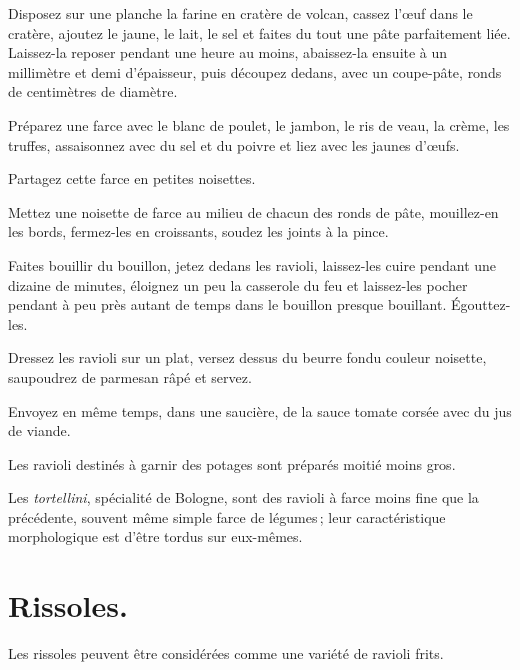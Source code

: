 Disposez sur une planche la farine en cratère de volcan, cassez l'œuf dans le
cratère, ajoutez le jaune, le lait, le sel et faites du tout une pâte
parfaitement liée. Laissez-la reposer pendant une heure au moins, abaissez-la
ensuite à un millimètre et demi d'épaisseur, puis découpez dedans, avec un
coupe-pâte, {\mmm} ronds de {\mmm} centimètres de diamètre.

Préparez une farce avec le blanc de poulet, le jambon, le ris de veau, la
crème, les truffes, assaisonnez avec du sel et du poivre et liez avec les
jaunes d'œufs.

Partagez cette farce en {\mmm} petites noisettes.

Mettez une noisette de farce au milieu de chacun des ronds de pâte, mouillez-en
les bords, fermez-les en croissants, soudez les joints à la pince.

Faites bouillir du bouillon, jetez dedans les ravioli, laissez-les cuire
pendant une dizaine de minutes, éloignez un peu la casserole du feu et
laissez-les pocher pendant à peu près autant de temps dans le bouillon presque
bouillant. Égouttez-les.

Dressez les ravioli sur un plat, versez dessus du beurre fondu couleur
noisette, saupoudrez de parmesan râpé et servez.

Envoyez en même temps, dans une saucière, de la sauce tomate corsée avec du jus
de viande.

\sk

Les ravioli destinés à garnir des potages sont préparés moitié moins gros.

\sk

Les \textit{tortellini}, spécialité de Bologne, sont des ravioli à farce moins
fine que la précédente, souvent même simple farce de légumes ; leur
caractéristique morphologique est d'être tordus sur eux-mêmes.

\section*{\centering Rissoles.}
{}

Les rissoles peuvent être considérées comme une variété de ravioli frits.

